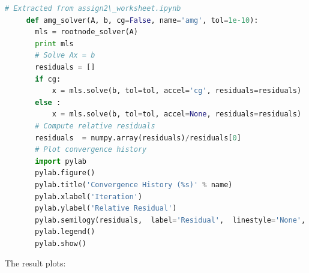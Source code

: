 \documentclass[a4paper,12pt]{article}
\begin{document}
\begin{lstlisting}[language=Python, caption={Solving Laplace equation using pyamg}, label={lst:border}]
     # Extracted from assign2\_worksheet.ipynb
     def amg_solver(A, b, cg=False, name='amg', tol=1e-10):
       mls = rootnode_solver(A)
       print mls
       # Solve Ax = b
       residuals = []
       if cg:
           x = mls.solve(b, tol=tol, accel='cg', residuals=residuals)
       else :
           x = mls.solve(b, tol=tol, accel=None, residuals=residuals)
       # Compute relative residuals
       residuals  = numpy.array(residuals)/residuals[0]  
       # Plot convergence history
       import pylab
       pylab.figure()
       pylab.title('Convergence History (%s)' % name)
       pylab.xlabel('Iteration')
       pylab.ylabel('Relative Residual')
       pylab.semilogy(residuals,  label='Residual',  linestyle='None', marker='.')
       pylab.legend()
       pylab.show()
\end{lstlisting}
\pagebreak
The result plots:
\end{document}
